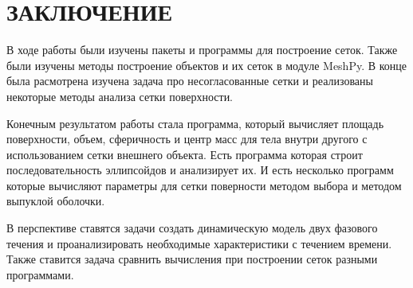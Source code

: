 \chapter*{ \large ЗАКЛЮЧЕНИЕ}
В ходе работы были изучены пакеты и программы для построение сеток. Также были изучены методы построение объектов и их сеток в модуле MeshPy. В конце была расмотрена изучена задача про несогласованные сетки и реализованы некоторые методы анализа сетки поверхности.

Конечным результатом работы стала программа, который вычисляет площадь поверхности, объем, сферичность и центр масс для тела внутри другого с использованием сетки внешнего объекта. Есть программа которая строит последовательность эллипсойдов и анализирует их. И есть несколько программ которые вычисляют параметры для сетки поверности методом выбора и методом выпуклой оболочки.

В перспективе ставятся задачи создать динамическую модель двух фазового течения и проанализировать необходимые характеристики с течением времени. 
Также ставится задача сравнить вычисления при построении сеток разными программами. 